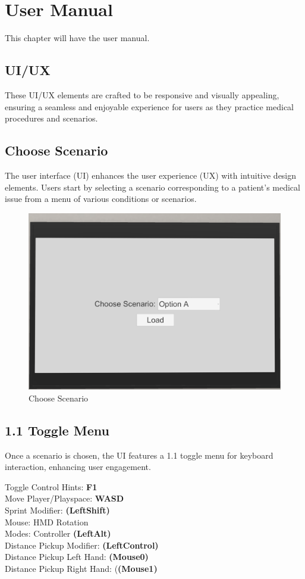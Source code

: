 \chapter{User Manual}
\label{ch:manual}
This chapter will have the user manual.
\section{UI/UX}
These UI/UX elements are crafted to be responsive and visually appealing, ensuring a seamless and enjoyable experience for users as they practice medical procedures and scenarios.
\section{Choose Scenario}
The user interface (UI) enhances the user experience (UX) with intuitive design elements. Users start by selecting a scenario corresponding to a patient's medical issue from a menu of various conditions or scenarios.
\begin{figure}[h]
    \centering
    \includegraphics[width=0.5\linewidth]{Images/screen.png}
    \caption{Choose Scenario}
    \label{fig:ChooseScenario}
\end{figure}
\section{1.1 Toggle Menu}
Once a scenario is chosen, the UI features a 1.1 toggle menu for keyboard interaction, enhancing user engagement.
\begin{center}
    {Toggle Control Hints:} \textbf{F1} \\ 
    {Move Player/Playspace:} \textbf{WASD} \\
    {Sprint Modifier:} \textbf{(LeftShift)} \\
    {Mouse:} HMD Rotation \\
    {Modes:} Controller \textbf{(LeftAlt)} \\
    {Distance Pickup Modifier:} \textbf{(LeftControl)} \\
    {Distance Pickup Left Hand:} \textbf{(Mouse0)} \\
    {Distance Pickup Right Hand:} (\textbf{(Mouse1)}
\end{center}
